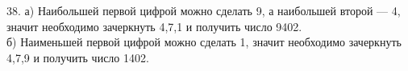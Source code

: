 38. а) Наибольшей первой цифрой можно сделать 9, а наибольшей второй --- 4, значит необходимо зачеркнуть 4,7,1 и получить число 9402.\\
б) Наименьшей первой цифрой можно сделать 1, значит необходимо зачеркнуть 4,7,9 и получить число 1402.\\
